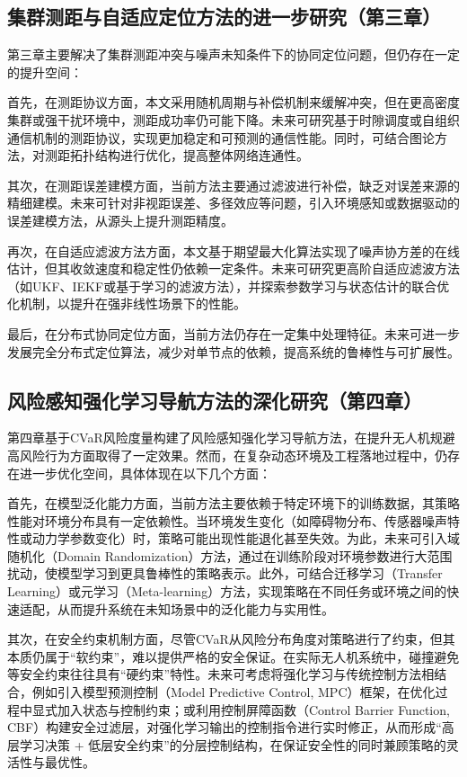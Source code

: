 \subsection{集群测距与自适应定位方法的进一步研究（第三章）}
第三章主要解决了集群测距冲突与噪声未知条件下的协同定位问题，但仍存在一定的提升空间：

首先，在测距协议方面，本文采用随机周期与补偿机制来缓解冲突，但在更高密度集群或强干扰环境中，测距成功率仍可能下降。未来可研究基于时隙调度或自组织通信机制的测距协议，实现更加稳定和可预测的通信性能。同时，可结合图论方法，对测距拓扑结构进行优化，提高整体网络连通性。

其次，在测距误差建模方面，当前方法主要通过滤波进行补偿，缺乏对误差来源的精细建模。未来可针对非视距误差、多径效应等问题，引入环境感知或数据驱动的误差建模方法，从源头上提升测距精度。

再次，在自适应滤波方法方面，本文基于期望最大化算法实现了噪声协方差的在线估计，但其收敛速度和稳定性仍依赖一定条件。未来可研究更高阶自适应滤波方法（如UKF、IEKF或基于学习的滤波方法），并探索参数学习与状态估计的联合优化机制，以提升在强非线性场景下的性能。

最后，在分布式协同定位方面，当前方法仍存在一定集中处理特征。未来可进一步发展完全分布式定位算法，减少对单节点的依赖，提高系统的鲁棒性与可扩展性。

\subsection{风险感知强化学习导航方法的深化研究（第四章）}

第四章基于CVaR风险度量构建了风险感知强化学习导航方法，在提升无人机规避高风险行为方面取得了一定效果。然而，在复杂动态环境及工程落地过程中，仍存在进一步优化空间，具体体现在以下几个方面：

首先，在模型泛化能力方面，当前方法主要依赖于特定环境下的训练数据，其策略性能对环境分布具有一定依赖性。当环境发生变化（如障碍物分布、传感器噪声特性或动力学参数变化）时，策略可能出现性能退化甚至失效。为此，未来可引入域随机化（Domain Randomization）方法，通过在训练阶段对环境参数进行大范围扰动，使模型学习到更具鲁棒性的策略表示。此外，可结合迁移学习（Transfer Learning）或元学习（Meta-learning）方法，实现策略在不同任务或环境之间的快速适配，从而提升系统在未知场景中的泛化能力与实用性。

其次，在安全约束机制方面，尽管CVaR从风险分布角度对策略进行了约束，但其本质仍属于“软约束”，难以提供严格的安全保证。在实际无人机系统中，碰撞避免等安全约束往往具有“硬约束”特性。未来可考虑将强化学习与传统控制方法相结合，例如引入模型预测控制（Model Predictive Control, MPC）框架，在优化过程中显式加入状态与控制约束；或利用控制屏障函数（Control Barrier Function, CBF）构建安全过滤层，对强化学习输出的控制指令进行实时修正，从而形成“高层学习决策 + 低层安全约束”的分层控制结构，在保证安全性的同时兼顾策略的灵活性与最优性。

